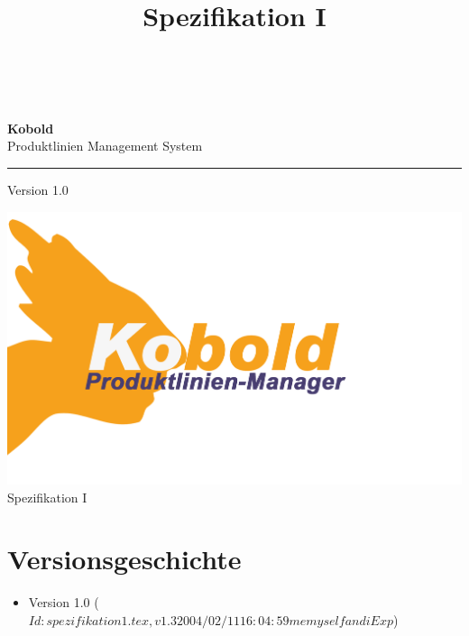 \documentclass[a4paper,titlepage,12pt,ngerman]{scrbook}
\title {\huge \product\\[0.5cm]\large Spezifikation I \\[0.5cm] \version
  \\[1cm] \Large \company}
\newcommand\version{Version 1.0\xspace}
\begin{document}

\begin{titlepage}
\renewcommand{\thefootnote}{\fnsymbol{footnote}}
{\Huge
\raggedright
\textbf{\bf Kobold} \\
\huge Produktlinien Management System
\rule{\textwidth}{0.75pt}
\par
}
\begin{flushleft}
\normalsize
\version
\end{flushleft}

\vspace*{3cm}
\begin{center}

\end{center}
\vfill
\includegraphics[width=15cm]{../common/logo-color.png}
{\parindent=0cm
\Huge Spezifikation I
}


\setcounter{footnote}{0}
\end{titlepage}


\section*{Versionsgeschichte}

\begin{itemize}

\item Version 1.0  ($Id: spezifikation1.tex,v 1.3 2004/02/11 16:04:59 memyselfandi Exp $)


\end{itemize}


\tableofcontents








\appendix

\end{document}
